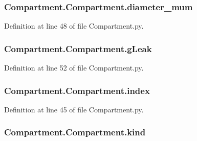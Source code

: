 \hypertarget{class_compartment_1_1_compartment_aacb7db7022f5d3534d17642d47281cbb}{
\subsubsection[{diameter\-\_\-mum}]{\setlength{\rightskip}{0pt plus 5cm}Compartment.\-Compartment.\-diameter\-\_\-mum}}\label{class_compartment_1_1_compartment_aacb7db7022f5d3534d17642d47281cbb}


Definition at line 48 of file Compartment.\-py.

\hypertarget{class_compartment_1_1_compartment_a10d50da6a622982a6483c7cd78482bde}{
\subsubsection[{g\-Leak}]{\setlength{\rightskip}{0pt plus 5cm}Compartment.\-Compartment.\-g\-Leak}}\label{class_compartment_1_1_compartment_a10d50da6a622982a6483c7cd78482bde}


Definition at line 52 of file Compartment.\-py.

\hypertarget{class_compartment_1_1_compartment_a9402ef46ede52521ebbb9e9d2d68d631}{
\subsubsection[{index}]{\setlength{\rightskip}{0pt plus 5cm}Compartment.\-Compartment.\-index}}\label{class_compartment_1_1_compartment_a9402ef46ede52521ebbb9e9d2d68d631}


Definition at line 45 of file Compartment.\-py.

\hypertarget{class_compartment_1_1_compartment_a74f2266a2231c4a81cc680bc201f0ffd}{
\subsubsection[{kind}]{\setlength{\rightskip}{0pt plus 5cm}Compartment.\-Compartment.\-kind}}\label{class_compartment_1_1_compartment_a74f2266a2231c4a81cc680bc201f0ffd}



